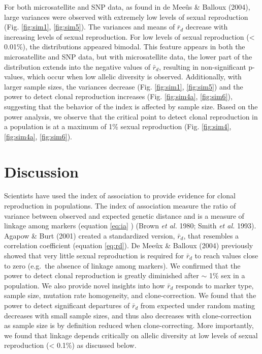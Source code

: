 \documentclass[]{article}
\theoremstyle{definition}
\theoremstyle{definition}
\theoremstyle{remark}
\begin{document}
For both microsatellite and SNP data, as found in de Meeûs \& Balloux
(2004), large variances were observed with extremely low levels of
sexual reproduction (Fig. \ref{fig:sim1}, \ref{fig:sim5}). The variances
and means of \(\bar{r}_d\) decrease with increasing levels of sexual
reproduction. For low levels of sexual reproduction (\textless{}
0.01\%), the distributions appeared bimodal. This feature appears in
both the microsatellite and SNP data, but with microsatellite data, the
lower part of the distribution extends into the negative values of
\(\bar{r}_d\), resulting in non-significant p-values, which occur when
low allelic diversity is observed. Additionally, with larger sample
sizes, the variances decrease (Fig. \ref{fig:sim1}, \ref{fig:sim5}) and
the power to detect clonal reproduction increases (Fig. \ref{fig:sim4a},
\ref{fig:sim6}), suggesting that the behavior of the index is affected
by sample size. Based on the power analysis, we observe that the
critical point to detect clonal reproduction in a population is at a
maximum of 1\% sexual reproduction (Fig. \ref{fig:sim4},
\ref{fig:sim4a}, \ref{fig:sim6}).

\section{Discussion}\label{discussion}

Scientists have used the index of association to provide evidence for
clonal reproduction in populations. The index of association measure the
ratio of variance between observed and expected genetic distance and is
a measure of linkage among markers (equation \eqref{eq:ia} ) (Brown
\emph{et al.} 1980; Smith \emph{et al.} 1993). Agapow \& Burt (2001)
created a standardized version, \(\bar{r}_d\), that resembles a
correlation coefficient (equation \eqref{eq:rd}). De Meeûx \& Balloux
(2004) previously showed that very little sexual reproduction is
required for \(\bar{r}_d\) to reach values close to zero (e.g.~the
absence of linkage among markers). We confirmed that the power to detect
clonal reproduction is greatly diminished after \(\sim\) 1\% sex in a
population. We also provide novel insights into how \(\bar{r}_d\)
responds to marker type, sample size, mutation rate homogeneity, and
clone-correction. We found that the power to detect significant
departures of \(\bar{r}_d\) from expected under random mating decreases
with small sample sizes, and thus also decreases with clone-correction
as sample size is by definition reduced when clone-correcting. More
importantly, we found that linkage depends critically on allelic
diversity at low levels of sexual reproduction (\textless{} 0.1\%) as
discussed below.
\end{document}
